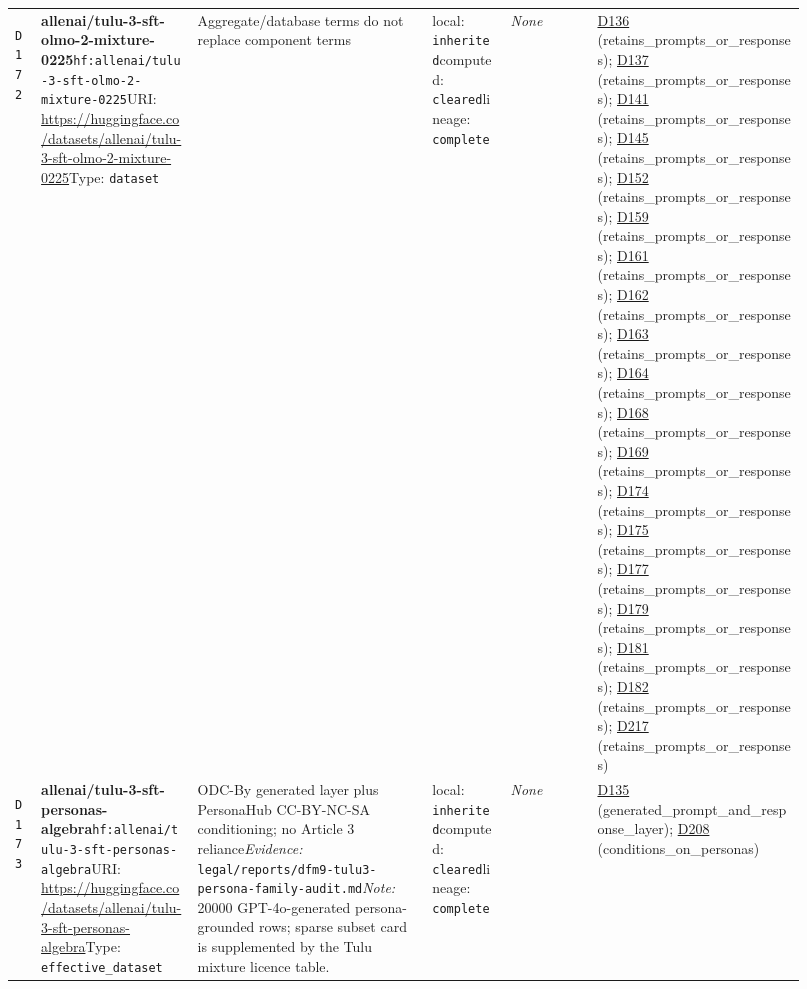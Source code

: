 \documentclass[9pt,a4paper]{article}
\newcommand{\depid}[1]{\hypertarget{dep:#1}{\texttt{#1}}}
\begin{document}
\begin{landscape}
\begin{longtable}{@{}L{0.035\linewidth}L{0.185\linewidth}L{0.27\linewidth}L{0.09\linewidth}L{0.10\linewidth}L{0.24\linewidth}@{}}
\depid{D172} & \textbf{allenai/tulu-3-sft-olmo-2-mixture-0225}\newline \nolinkurl{hf:allenai/tulu-3-sft-olmo-2-mixture-0225}\newline URI: \url{https://huggingface.co/datasets/allenai/tulu-3-sft-olmo-2-mixture-0225}\newline Type: \texttt{dataset} & Aggregate/database terms do not replace component terms & local: \texttt{inherited}\newline computed: \texttt{cleared}\newline lineage: \texttt{complete} & \textit{None} & \hyperlink{dep:D136}{D136} (retains\_prompts\_or\_responses); \hyperlink{dep:D137}{D137} (retains\_prompts\_or\_responses); \hyperlink{dep:D141}{D141} (retains\_prompts\_or\_responses); \hyperlink{dep:D145}{D145} (retains\_prompts\_or\_responses); \hyperlink{dep:D152}{D152} (retains\_prompts\_or\_responses); \hyperlink{dep:D159}{D159} (retains\_prompts\_or\_responses); \hyperlink{dep:D161}{D161} (retains\_prompts\_or\_responses); \hyperlink{dep:D162}{D162} (retains\_prompts\_or\_responses); \hyperlink{dep:D163}{D163} (retains\_prompts\_or\_responses); \hyperlink{dep:D164}{D164} (retains\_prompts\_or\_responses); \hyperlink{dep:D168}{D168} (retains\_prompts\_or\_responses); \hyperlink{dep:D169}{D169} (retains\_prompts\_or\_responses); \hyperlink{dep:D174}{D174} (retains\_prompts\_or\_responses); \hyperlink{dep:D175}{D175} (retains\_prompts\_or\_responses); \hyperlink{dep:D177}{D177} (retains\_prompts\_or\_responses); \hyperlink{dep:D179}{D179} (retains\_prompts\_or\_responses); \hyperlink{dep:D181}{D181} (retains\_prompts\_or\_responses); \hyperlink{dep:D182}{D182} (retains\_prompts\_or\_responses); \hyperlink{dep:D217}{D217} (retains\_prompts\_or\_responses) \\
\depid{D173} & \textbf{allenai/tulu-3-sft-personas-algebra}\newline \nolinkurl{hf:allenai/tulu-3-sft-personas-algebra}\newline URI: \url{https://huggingface.co/datasets/allenai/tulu-3-sft-personas-algebra}\newline Type: \texttt{effective\_dataset} & ODC-By generated layer plus PersonaHub CC-BY-NC-SA conditioning; no Article 3 reliance\newline \textit{Evidence:} \nolinkurl{legal/reports/dfm9-tulu3-persona-family-audit.md}\newline \textit{Note:} 20000 GPT-4o-generated persona-grounded rows; sparse subset card is supplemented by the Tulu mixture licence table. & local: \texttt{inherited}\newline computed: \texttt{cleared}\newline lineage: \texttt{complete} & \textit{None} & \hyperlink{dep:D135}{D135} (generated\_prompt\_and\_response\_layer); \hyperlink{dep:D208}{D208} (conditions\_on\_personas) \\

\end{longtable}
\end{landscape}
\end{document}
